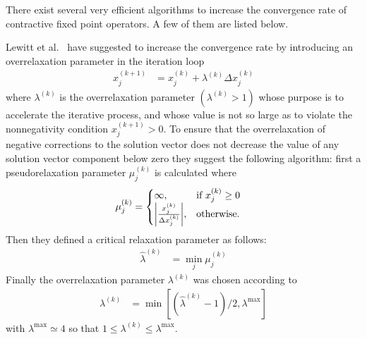 There exist several very efficient algorithms to increase the convergence rate of contractive fixed point operators. A few of them are listed below.

 Lewitt et al.\ \cite{Lewitt1986} have suggested to increase the convergence rate by introducing an overrelaxation parameter in the iteration loop
\begin{align}\label{eq:OverRelaxation}
  x_j^{(k+1)} &= x_j^{(k)} + \lambda^{(k)}\Delta x_j^{(k)}
\end{align}
where $\lambda^{(k)}$ is the overrelaxation parameter $(\lambda^{(k)}> 1)$ whose
purpose is to accelerate the iterative process, and whose value is not so large as to violate the nonnegativity condition $x_j^{(k+1)} > 0$. To ensure that the overrelaxation of negative corrections to the solution vector does not decrease the value of any solution vector component below zero they suggest the following algorithm: first a pseudorelaxation parameter $\mu_j^{(k)}$ is calculated where
\begin{align}
\label{eq:pseudorelaxation}
  \mu_j^{(k)} &=
  \begin{cases}
    \infty, & \mbox{if } x_j^{(k)} \geq 0 \\
    {\left\vert\frac{x_j^{(k)}}{\Delta x_j^{(k)}}\right\vert}, & \mbox{otherwise}.
  \end{cases}
\end{align}
Then they defined a critical relaxation parameter as follows:
\begin{align}\label{eq:criticalrelaxationparameter}
  \hat{\lambda}^{(k)} &= \min_j \mu_j^{(k)}
\end{align}
Finally the overrelaxation parameter $\lambda^{(k)}$ was chosen according to
\begin{align}\label{eq:useopverrelaxationparameter}
  \lambda^{(k)} &= \min \left[ \left(\hat{\lambda}^{(k)}-1\right)/2,\lambda^{\max}\right]
\end{align}
with $\lambda^{\max} \simeq 4$ so that $1\leq  \lambda^{(k)}\leq \lambda^{\max}$.

